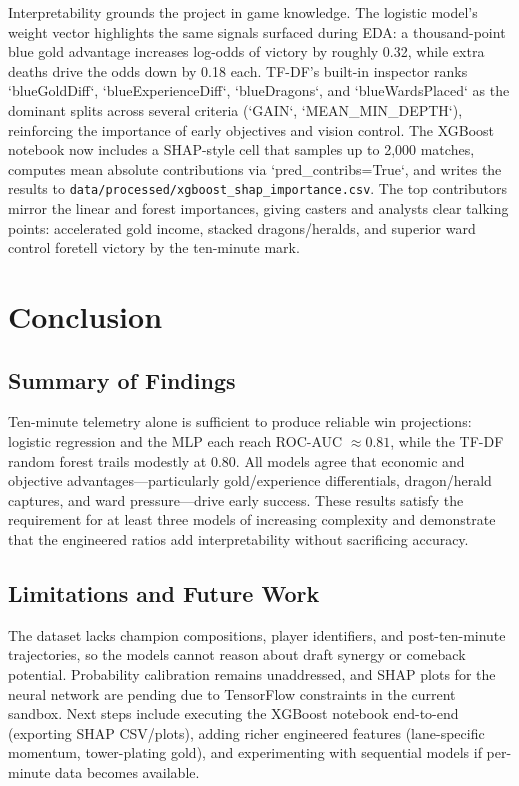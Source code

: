 \documentclass[aps,prl,preprint,groupedaddress]{revtex4-2}
\begin{document}
Interpretability grounds the project in game knowledge. The logistic model's weight vector highlights the same signals surfaced during EDA: a thousand-point blue gold advantage increases log-odds of victory by roughly 0.32, while extra deaths drive the odds down by 0.18 each. TF-DF's built-in inspector ranks `blueGoldDiff`, `blueExperienceDiff`, `blueDragons`, and `blueWardsPlaced` as the dominant splits across several criteria (`GAIN`, `MEAN_MIN_DEPTH`), reinforcing the importance of early objectives and vision control. The XGBoost notebook now includes a SHAP-style cell that samples up to 2,000 matches, computes mean absolute contributions via `pred_contribs=True`, and writes the results to \texttt{data/processed/xgboost\_shap\_importance.csv}. The top contributors mirror the linear and forest importances, giving casters and analysts clear talking points: accelerated gold income, stacked dragons/heralds, and superior ward control foretell victory by the ten-minute mark.

\section{Conclusion}
\label{sec:conclusion}

\subsection{Summary of Findings}
Ten-minute telemetry alone is sufficient to produce reliable win projections: logistic regression and the MLP each reach ROC-AUC $\approx0.81$, while the TF-DF random forest trails modestly at 0.80. All models agree that economic and objective advantages---particularly gold/experience differentials, dragon/herald captures, and ward pressure---drive early success. These results satisfy the requirement for at least three models of increasing complexity and demonstrate that the engineered ratios add interpretability without sacrificing accuracy.

\subsection{Limitations and Future Work}
The dataset lacks champion compositions, player identifiers, and post-ten-minute trajectories, so the models cannot reason about draft synergy or comeback potential. Probability calibration remains unaddressed, and SHAP plots for the neural network are pending due to TensorFlow constraints in the current sandbox. Next steps include executing the XGBoost notebook end-to-end (exporting SHAP CSV/plots), adding richer engineered features (lane-specific momentum, tower-plating gold), and experimenting with sequential models if per-minute data becomes available.
\end{document}
